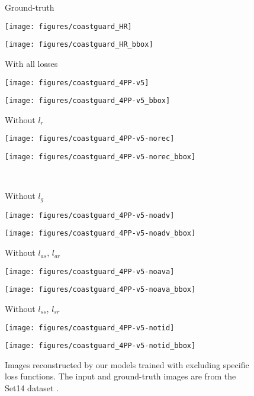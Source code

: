 \documentclass[runningheads]{llncs}
\begin{document}
\begin{figure*}[t!]
	\centering
	\begin{minipage}[b]{0.3\linewidth}
		\centering
		\centerline{\scriptsize{Ground-truth}}\medskip
		\centerline{\texttt{[image: figures/coastguard\_HR]}}\smallskip
		\centerline{\texttt{[image: figures/coastguard\_HR\_bbox]}}
	\end{minipage}
	\begin{minipage}[b]{0.3\linewidth}
		\centering
		\centerline{\scriptsize{With all losses}}\medskip
		\centerline{\texttt{[image: figures/coastguard\_4PP-v5]}}\smallskip
		\centerline{\texttt{[image: figures/coastguard\_4PP-v5\_bbox]}}
	\end{minipage}
	\begin{minipage}[b]{0.3\linewidth}
		\centering
		\centerline{\scriptsize{Without ${l}_{r}$}}\medskip
		\centerline{\texttt{[image: figures/coastguard\_4PP-v5-norec]}}\smallskip
		\centerline{\texttt{[image: figures/coastguard\_4PP-v5-norec\_bbox]}}
	\end{minipage}
	\medskip \\ \medskip
	\begin{minipage}[b]{0.3\linewidth}
		\centering
		\centerline{\scriptsize{Without ${l}_{g}$}}\medskip
		\centerline{\texttt{[image: figures/coastguard\_4PP-v5-noadv]}}\smallskip
		\centerline{\texttt{[image: figures/coastguard\_4PP-v5-noadv\_bbox]}}
	\end{minipage}
	\begin{minipage}[b]{0.3\linewidth}
		\centering
		\centerline{\scriptsize{Without ${l}_{as}$, ${l}_{ar}$}}\medskip
		\centerline{\texttt{[image: figures/coastguard\_4PP-v5-noava]}}\smallskip
		\centerline{\texttt{[image: figures/coastguard\_4PP-v5-noava\_bbox]}}
	\end{minipage}
	\begin{minipage}[b]{0.3\linewidth}
		\centering
		\centerline{\scriptsize{Without ${l}_{ss}$, ${l}_{sr}$}}\medskip
		\centerline{\texttt{[image: figures/coastguard\_4PP-v5-notid]}}\smallskip
		\centerline{\texttt{[image: figures/coastguard\_4PP-v5-notid\_bbox]}}
	\end{minipage}
	\caption{Images reconstructed by our models trained with excluding specific loss functions. The input and ground-truth images are from the Set14 dataset \cite{zeyde2010single}.}
	\label{fig:result_loss_comparison}
\end{figure*}
\end{document}
